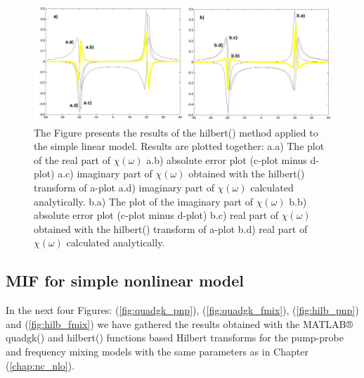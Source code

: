 \documentclass[12pt,twoside,a4paper]{article}
\numberwithin{equation}{subsection}
\numberwithin{figure}{subsection}
\begin{document}
\begin{figure} 
  \includegraphics[width=150mm]{img/hilb_lin.png}
  \caption{The Figure presents the results of the hilbert() method applied to the simple linear model. Results are plotted together:
   a.a) The plot of the real part of $\chi (\omega )$ 
   a.b) absolute error plot (c-plot minus d-plot) 
   a.c) imaginary part of $\chi (\omega )$ obtained with the hilbert() transform of a-plot 
   a.d) imaginary part of $\chi (\omega )$  calculated analytically. 
   b.a) The plot of the imaginary part of $\chi (\omega )$ 
   b.b) absolute error plot (c-plot minus d-plot) 
   b.c) real part of $\chi (\omega )$ obtained with the hilbert() transform of a-plot 
   b.d) real part of $\chi (\omega )$ calculated analytically. \label{fig:hilb_lin}
  }
\end{figure}

\subsection{MIF for simple nonlinear model} \label{chap:matlab_nlo}

In the next four Figures: (\ref{fig:quadgk_pnp}), (\ref{fig:quadgk_fmix}), (\ref{fig:hilb_pnp}) and (\ref{fig:hilb_fmix}) we have gathered the results obtained with the MATLAB® quadgk() and hilbert() functions based Hilbert transforms for the pump-probe and frequency mixing models with the same parameters as in Chapter (\ref{chap:nc_nlo}). 
\end{document}
